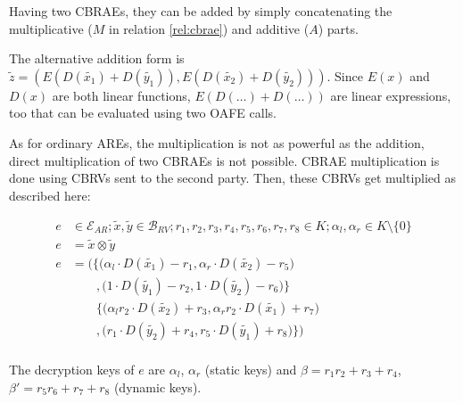 Having two CBRAEs, they can be added by simply concatenating the multiplicative
($M$ in relation \ref{rel:cbrae}) and additive ($A$) parts.



The alternative addition form is
$\widetilde{z} =
\left( E\left(D(\widetilde{x_1}) + D(\widetilde{y_1})\right),
       E\left(D(\widetilde{x_2}) + D(\widetilde{y_2})\right)
\right)$.
Since $E(x)$ and $D(x)$ are both linear functions,
$E\left(D(\ldots) +D(\ldots)\right)$
are linear expressions, too that can be evaluated using two OAFE calls.



As for ordinary AREs, the multiplication is not as powerful as the addition,
direct multiplication of two CBRAEs is not possible. CBRAE multiplication is
done using CBRVs sent to the second party. Then, these CBRVs get multiplied as
described here:

\begin{align*}
  e & \in \mathcal{E}_{AR}; \widetilde{x}, \widetilde{y} \in \mathcal{B}_{RV};
  r_1, r_2, r_3, r_4, r_5, r_6, r_7, r_8 \in K;
  \alpha_l, \alpha_r \in K \setminus \{0\} \\
  e & = \widetilde{x} \otimes \widetilde{y} \\
  e & = \Bigg(\Big\{\big( \alpha_l \cdot D(\widetilde{x_1}) - r_1,
                          \alpha_r \cdot D(\widetilde{x_2}) -r_5 \big) \\
    &\qquad ,     \big(   1        \cdot D(\widetilde{y_1}) - r_2,
                          1        \cdot D(\widetilde{y_2}) - r_6 \big) \Big\}\\
    &\qquad   \Big\{\big( \alpha_lr_2 \cdot D(\widetilde{x_2}) + r_3,
                          \alpha_rr_2 \cdot D(\widetilde{x_1}) + r_7 \big) \\
    &\qquad ,       \big ( r_1        \cdot D(\widetilde{y_2}) + r_4,
                           r_5        \cdot D(\widetilde{y_1}) + r_8 \big)
              \Big\}\Bigg) \\
\end{align*}

The decryption keys of $e$ are $\alpha_l$, $\alpha_r$ (static keys) and
$\beta = r_1r_2 + r_3 + r_4$, $\beta' = r_5r_6 + r_7 + r_8$ (dynamic keys).


\label{sec:eval-final-value}

